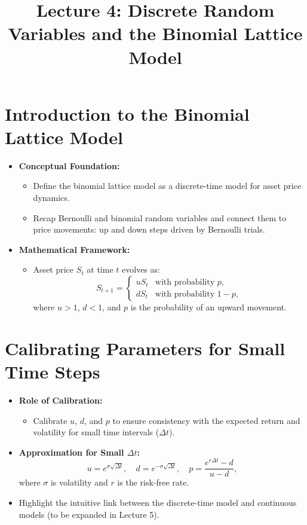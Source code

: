 \documentclass[12pt]{article}
\title{Lecture 4: Discrete Random Variables and the Binomial Lattice Model}
\author{}
\date{}
\begin{document}
	
	\maketitle
	
	\section*{Introduction to the Binomial Lattice Model}
	\begin{itemize}
		\item \textbf{Conceptual Foundation:}
		\begin{itemize}
			\item Define the binomial lattice model as a discrete-time model for asset price dynamics.
			\item Recap Bernoulli and binomial random variables and connect them to price movements: up and down steps driven by Bernoulli trials.
		\end{itemize}
		\item \textbf{Mathematical Framework:}
		\begin{itemize}
			\item Asset price $S_t$ at time $t$ evolves as:
			\[
			S_{t+1} = 
			\begin{cases} 
				u S_t & \text{with probability } p, \\
				d S_t & \text{with probability } 1-p,
			\end{cases}
			\]
			where $u > 1$, $d < 1$, and $p$ is the probability of an upward movement.
		\end{itemize}
	\end{itemize}
	
	\section*{Calibrating Parameters for Small Time Steps}
	\begin{itemize}
		\item \textbf{Role of Calibration:}
		\begin{itemize}
			\item Calibrate $u$, $d$, and $p$ to ensure consistency with the expected return and volatility for small time intervals ($\Delta t$).
		\end{itemize}
		\item \textbf{Approximation for Small $\Delta t$:}
		\[
		u = e^{\sigma \sqrt{\Delta t}}, \quad d = e^{-\sigma \sqrt{\Delta t}}, \quad p = \frac{e^{r \Delta t} - d}{u - d},
		\]
		where $\sigma$ is volatility and $r$ is the risk-free rate.
		\item Highlight the intuitive link between the discrete-time model and continuous models (to be expanded in Lecture 5).
	\end{itemize}
	
\end{document}
